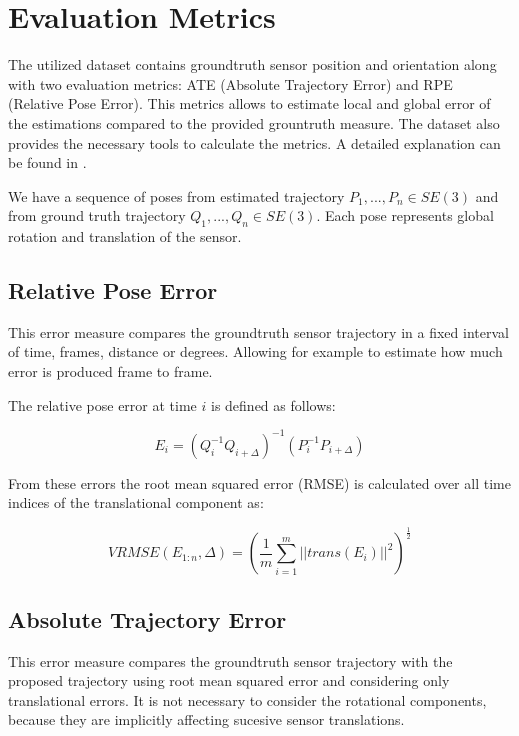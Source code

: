 \section{Evaluation Metrics}

The utilized dataset contains groundtruth sensor position and orientation along with two 
evaluation metrics: ATE (Absolute Trajectory Error) and RPE (Relative Pose Error). This metrics 
allows to estimate local and global error of the estimations compared to the provided grountruth measure. The dataset
 also provides the necessary tools to calculate the metrics. A detailed explanation can be found in \cite{sturm12iros}.

We have a sequence of poses from estimated trajectory $P_1,...,P_n \in SE(3)$ and from ground truth trajectory 
$Q_1,...,Q_n \in SE(3)$. Each pose represents global rotation and translation of the sensor.



\subsection{Relative Pose Error}

This error measure compares the groundtruth sensor trajectory in a fixed interval of time, frames, distance or degrees. 
Allowing for example to estimate how much error is produced frame to frame.

The relative pose error at time $i$ is defined as follows:

\begin{equation}
E_i = ( Q_i^{-1} Q_{i+\Delta})^{-1}(P_i^{-1}P_{i+\Delta})
\end{equation}

From these errors the root mean squared error (RMSE) is calculated over all time indices of the translational component as:

\begin{equation}
VRMSE(E_{1:n},\Delta) = (\frac{1}{m} \sum_{i=1}^m ||trans(E_i)||^2 )^{\frac{1}{2}}
\end{equation}


\subsection{Absolute Trajectory Error}

This error measure compares the groundtruth sensor trajectory with the proposed trajectory using root mean 
squared error and considering only translational errors. It is not necessary to consider the rotational components, 
because they are implicitly affecting sucesive sensor translations.

